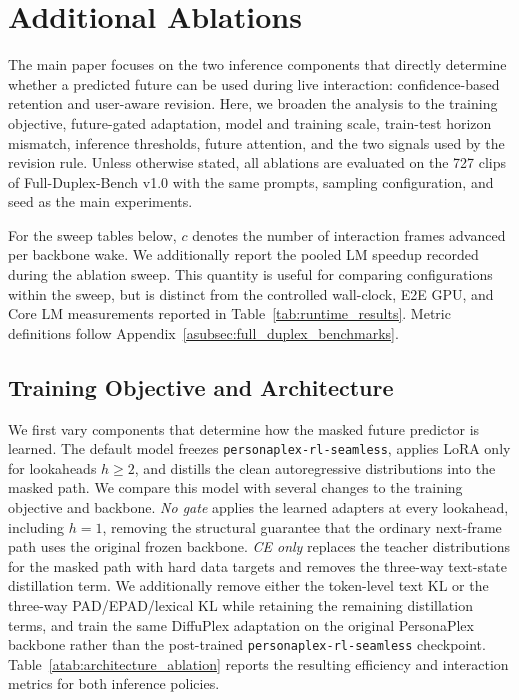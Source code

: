 \section{Additional Ablations}
\label{asec:additional_ablations}

The main paper focuses on the two inference components that directly determine whether a predicted future can be used during live interaction: confidence-based retention and user-aware revision.
Here, we broaden the analysis to the training objective, future-gated adaptation, model and training scale, train-test horizon mismatch, inference thresholds, future attention, and the two signals used by the revision rule.
Unless otherwise stated, all ablations are evaluated on the 727 clips of Full-Duplex-Bench v1.0 with the same prompts, sampling configuration, and seed as the main experiments.

For the sweep tables below, $c$ denotes the number of interaction frames advanced per backbone wake.
We additionally report the pooled LM speedup recorded during the ablation sweep.
This quantity is useful for comparing configurations within the sweep, but is distinct from the controlled wall-clock, E2E GPU, and Core LM measurements reported in Table~\ref{tab:runtime_results}.
Metric definitions follow Appendix~\ref{asubsec:full_duplex_benchmarks}.

\subsection{Training Objective and Architecture}
\label{asubsec:backbone_ablation}

We first vary components that determine how the masked future predictor is learned.
The default model freezes \texttt{personaplex-rl-seamless}, applies LoRA only for lookaheads $h\geq2$, and distills the clean autoregressive distributions into the masked path.
We compare this model with several changes to the training objective and backbone.
\emph{No gate} applies the learned adapters at every lookahead, including $h=1$, removing the structural guarantee that the ordinary next-frame path uses the original frozen backbone.
\emph{CE only} replaces the teacher distributions for the masked path with hard data targets and removes the three-way text-state distillation term.
We additionally remove either the token-level text KL or the three-way PAD/EPAD/lexical KL while retaining the remaining distillation terms, and train the same DiffuPlex adaptation on the original PersonaPlex backbone rather than the post-trained \texttt{personaplex-rl-seamless} checkpoint.
Table~\ref{atab:architecture_ablation} reports the resulting efficiency and interaction metrics for both inference policies.

